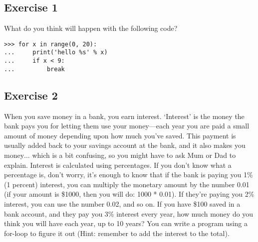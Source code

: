 \subsection*{Exercise 1}
What do you think will happen with the following code?

\begin{listing}
\begin{verbatim}
>>> for x in range(0, 20):
...     print('hello %s' % x)
...     if x < 9:
...         break
\end{verbatim}
\end{listing}

\subsection*{Exercise 2}
When you save money in a bank, you earn interest.  `Interest' is the money the bank pays you for letting them use your money---each year you are paid a small amount of money depending upon how much you've saved.  This payment is usually added back to your savings account at the bank, and it also makes you money$\ldots$ which is a bit confusing, so you might have to ask Mum or Dad to explain.
Interest is calculated using percentages.  If you don't know what a percentage is, don't worry, it's enough to know that if the bank is paying you 1\% (1 percent) interest, you can multiply the monetary amount by the number 0.01 (if your amount is \$1000, then you will do: 1000 * 0.01).  If they're paying you 2\% interest, you can use the number 0.02, and so on.  
If you have \$100 saved in a bank account, and they pay you 3\% interest every year, how much money do you think you will have each year, up to 10 years?  You can write a program using a for-loop to figure it out  (Hint: remember to add the interest to the total).
\newpage
